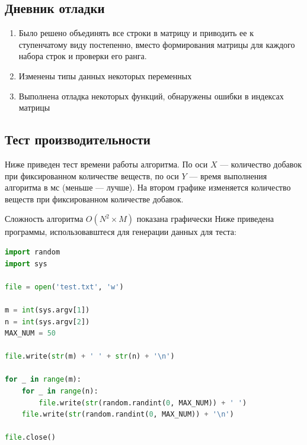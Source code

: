 \documentclass[12pt]{article}
\begin{document}
\subsection*{Дневник отладки}

\begin{enumerate}
    \item Было решено объединять все строки в матрицу и приводить ее к ступенчатому виду постепенно, вместо формирования матрицы для каждого набора строк и проверки его ранга.
    \item Изменены типы данных некоторых переменных
    \item Выполнена отладка некоторых функций, обнаружены ошибки в индексах
    матрицы
\end{enumerate}

\subsection*{Тест производительности}

Ниже приведен тест времени работы алгоритма. По оси $X$ — количество 
добавок при фиксированном количестве веществ, по оси $Y$ — время выполнения алгоритма в мс (меньше — лучше).
На втором графике изменяется количество веществ при фиксированном количестве добавок.




Сложность алгоритма $O(N^2 \times M)$ показана графически
Ниже приведена программы, использовавштеся для генерации данных для теста:

\begin{lstlisting}[language=Python]
import random
import sys

file = open('test.txt', 'w')

m = int(sys.argv[1])
n = int(sys.argv[2])
MAX_NUM = 50

file.write(str(m) + ' ' + str(n) + '\n')

for _ in range(m):
    for _ in range(n):
        file.write(str(random.randint(0, MAX_NUM)) + ' ')
    file.write(str(random.randint(0, MAX_NUM)) + '\n')

file.close()
\end{lstlisting}
\end{document}
